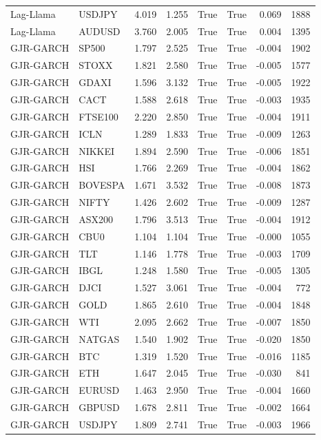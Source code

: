 \begin{table}[H]
\begin{tabular}{llrrrrrr}
Lag-Llama & USDJPY & 4.019 & 1.255 & True & True & 0.069 & 1888 \\
Lag-Llama & AUDUSD & 3.760 & 2.005 & True & True & 0.004 & 1395 \\
GJR-GARCH & SP500 & 1.797 & 2.525 & True & True & -0.004 & 1902 \\
GJR-GARCH & STOXX & 1.821 & 2.580 & True & True & -0.005 & 1577 \\
GJR-GARCH & GDAXI & 1.596 & 3.132 & True & True & -0.005 & 1922 \\
GJR-GARCH & CACT & 1.588 & 2.618 & True & True & -0.003 & 1935 \\
GJR-GARCH & FTSE100 & 2.220 & 2.850 & True & True & -0.004 & 1911 \\
GJR-GARCH & ICLN & 1.289 & 1.833 & True & True & -0.009 & 1263 \\
GJR-GARCH & NIKKEI & 1.894 & 2.590 & True & True & -0.006 & 1851 \\
GJR-GARCH & HSI & 1.766 & 2.269 & True & True & -0.004 & 1862 \\
GJR-GARCH & BOVESPA & 1.671 & 3.532 & True & True & -0.008 & 1873 \\
GJR-GARCH & NIFTY & 1.426 & 2.602 & True & True & -0.009 & 1287 \\
GJR-GARCH & ASX200 & 1.796 & 3.513 & True & True & -0.004 & 1912 \\
GJR-GARCH & CBU0 & 1.104 & 1.104 & True & True & -0.000 & 1055 \\
GJR-GARCH & TLT & 1.146 & 1.778 & True & True & -0.003 & 1709 \\
GJR-GARCH & IBGL & 1.248 & 1.580 & True & True & -0.005 & 1305 \\
GJR-GARCH & DJCI & 1.527 & 3.061 & True & True & -0.004 & 772 \\
GJR-GARCH & GOLD & 1.865 & 2.610 & True & True & -0.004 & 1848 \\
GJR-GARCH & WTI & 2.095 & 2.662 & True & True & -0.007 & 1850 \\
GJR-GARCH & NATGAS & 1.540 & 1.902 & True & True & -0.020 & 1850 \\
GJR-GARCH & BTC & 1.319 & 1.520 & True & True & -0.016 & 1185 \\
GJR-GARCH & ETH & 1.647 & 2.045 & True & True & -0.030 & 841 \\
GJR-GARCH & EURUSD & 1.463 & 2.950 & True & True & -0.004 & 1660 \\
GJR-GARCH & GBPUSD & 1.678 & 2.811 & True & True & -0.002 & 1664 \\
GJR-GARCH & USDJPY & 1.809 & 2.741 & True & True & -0.003 & 1966 \\

\end{tabular}
\end{table}
